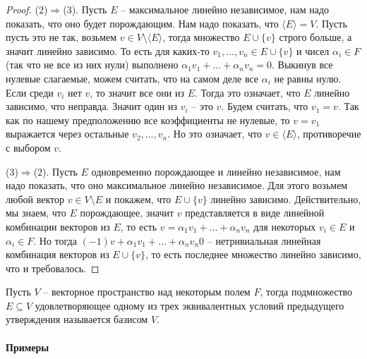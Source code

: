 \begin{proof}
(2)$\Rightarrow$(3).
Пусть $E$ -- максимальное линейно независимое, нам надо показать, что оно будет порождающим.
Нам надо показать, что $\langle E \rangle  = V$.
Пусть пусть это не так, возьмем $v\in V\setminus \langle E \rangle$, тогда множество $E\cup \{v\}$ строго больше, а значит линейно зависимо.
То есть для каких-то $v_1,\ldots,v_n \in E\cup \{v\}$ и чисел $\alpha_i \in F$ (так что не все из них нули) выполнено $\alpha_1 v_1 + \ldots + \alpha_n v_n = 0$.
Выкинув все нулевые слагаемые, можем считать, что на самом деле все $\alpha_i$ не равны нулю.
Если среди $v_i$ нет $v$, то значит все они из $E$.
Тогда это означает, что $E$ линейно зависимо, что неправда.
Значит один из $v_i$ -- это $v$.
Будем считать, что $v_1 = v$.
Так как по нашему предположению все коэффициенты не нулевые, то $v = v_1$ выражается через остальные $v_2,\ldots,v_n$.
Но это означает, что $v\in \langle E\rangle$, противоречие с выбором $v$.

(3)$\Rightarrow$(2).
Пусть $E$ одновременно порождающее и линейно независимое, нам надо показать, что оно максимальное линейно независимое.
Для этого возьмем любой вектор $v\in V\setminus E$ и покажем, что $E \cup \{v\}$ линейно зависимо.
Действительно, мы знаем, что $E$ порождающее, значит $v$ представляется в виде линейной комбинации векторов из $E$, то есть $v = \alpha_1 v_1 + \ldots + \alpha_n v_n$ для некоторых $v_i\in E$ и $\alpha_i\in F$.
Но тогда $(-1)v + \alpha_1 v_1 + \ldots + \alpha_n v_n  0$ -- нетривиальная линейная комбинация векторов из $E\cup \{v\}$, то есть последнее множество линейно зависимо, что и требовалось.
\end{proof}

Пусть $V$ -- векторное пространство над некоторым полем $F$, тогда подмножество $E\subseteq V$ удовлетворяющее одному из трех эквивалентных условий предыдущего утверждения называется базисом $V$.

\paragraph{Примеры}

